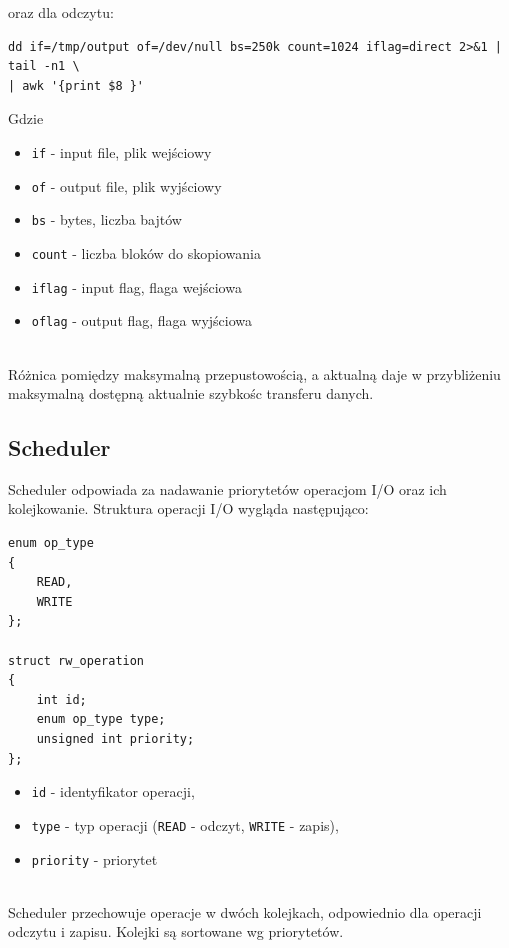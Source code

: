 oraz dla odczytu:

\begin{verbatim}
dd if=/tmp/output of=/dev/null bs=250k count=1024 iflag=direct 2>&1 | tail -n1 \
| awk '{print $8 }'
\end{verbatim}

Gdzie
\begin{itemize}
	\item \texttt{if} - input file, plik wejściowy
    \item \texttt{of} - output file, plik wyjściowy
    \item \texttt{bs} - bytes, liczba bajtów
    \item \texttt{count} - liczba bloków do skopiowania
    \item \texttt{iflag} - input flag, flaga wejściowa
    \item \texttt{oflag} - output flag, flaga wyjściowa
\end{itemize}
\ \\


Różnica pomiędzy maksymalną przepustowością, a aktualną daje w przybliżeniu maksymalną
dostępną aktualnie szybkośc transferu danych.

\subsection{Scheduler}
Scheduler odpowiada za nadawanie priorytetów operacjom I/O oraz ich kolejkowanie. Struktura operacji I/O wygląda następująco:

\begingroup\singlespacing
\begin{verbatim}
enum op_type
{
    READ,
    WRITE
};

struct rw_operation
{
    int id;
    enum op_type type;
    unsigned int priority;
};
\end{verbatim}
\endgroup

\begin{itemize}
	\item \texttt{id} - identyfikator operacji,
    \item \texttt{type} - typ operacji (\texttt{READ} - odczyt, \texttt{WRITE} - zapis),
    \item \texttt{priority} - priorytet
\end{itemize}
\ \\

Scheduler przechowuje operacje w dwóch kolejkach, odpowiednio dla operacji odczytu i zapisu.
Kolejki są sortowane wg priorytetów.

